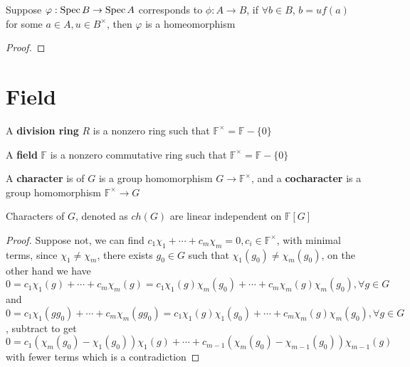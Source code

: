 \documentclass[main]{subfiles}
\begin{document}
\begin{proposition}\label{06:35-04/28/2022}
Suppose $\varphi:\operatorname{Spec} B\to \operatorname{Spec} A$ corresponds to $\phi:A\to B$, if $\forall b\in B$, $b=uf(a)$ for some $a\in A,u\in B^\times$, then $\varphi$ is a homeomorphism
\end{proposition}

\begin{proof}

\end{proof}



\section{Field}

\begin{definition}
A \textbf{division ring} $R$ is a nonzero ring such that $\mathbb F^\times=\mathbb F-\{0\}$ \par
A \textbf{field} $\mathbb F$ is a nonzero commutative ring such that $\mathbb F^\times=\mathbb F-\{0\}$
\end{definition}

\begin{definition}
A \textbf{character} is of $G$ is a group homomorphism $G\to\mathbb F^\times$, and a \textbf{cocharacter} is a group homomorphism $\mathbb F^\times\to G$
\end{definition}

\begin{lemma}
Characters of $G$, denoted as $ch(G)$ are linear independent on $\mathbb F[G]$
\end{lemma}

\begin{proof}
Suppose not, we can find $c_1\chi_1+\cdots+c_m\chi_m=0,c_i\in\mathbb F^\times$, with minimal terms, since $\chi_1\neq\chi_m$, there exists $g_0\in G$ such that $\chi_1(g_0)\neq\chi_m(g_0)$, on the other hand we have $0=c_1\chi_1(g)+\cdots+c_m\chi_m(g)=c_1\chi_1(g)\chi_m(g_0)+\cdots+c_m\chi_m(g)\chi_m(g_0),\forall g\in G$ and $0=c_1\chi_1(gg_0)+\cdots+c_m\chi_m(gg_0)=c_1\chi_1(g)\chi_1(g_0)+\cdots+c_m\chi_m(g)\chi_m(g_0),\forall g\in G$, subtract to get $0=c_1(\chi_m(g_0)-\chi_1(g_0))\chi_1(g)+\cdots+c_{m-1}(\chi_m(g_0)-\chi_{m-1}(g_0))\chi_{m-1}(g)$ with fewer terms which is a contradiction
\end{proof}
\end{document}
